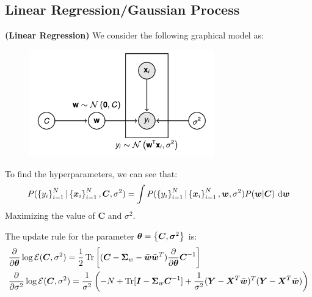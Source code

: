 \subsection{Linear Regression/Gaussian Process}

\begin{definition}{\textbf{(Linear Regression)}}
    We consider the following graphical model as:
    \begin{figure}[H]
        \centering
        \includegraphics[width=8cm]{img/img11.png}
    \end{figure}  
    To find the hyperparameters, we can see that:
    \begin{equation*}
        P(\left\{ y_i \right\}^N_{i=1} | \left\{ \boldsymbol x_i \right\}^N_{i=1}, \boldsymbol C, \sigma^2) = \int P(\left\{ y_i \right\}^N_{i=1} | \left\{ \boldsymbol x_i \right\}^N_{i=1}, \boldsymbol w, \sigma^2)P(\boldsymbol w | \boldsymbol C)\ \mathrm{d} \boldsymbol w
    \end{equation*}
    Maximizing the value of $\boldsymbol C$ and $\sigma^2$.
\end{definition}

\begin{proposition}
    The update rule for the parameter $\boldsymbol \theta = \left\{ \boldsymbol C, \boldsymbol \sigma^2 \right\}$ is:
    \begin{equation*}
    \begin{aligned}
        &\frac{\partial}{\partial \boldsymbol \theta} \log \mathcal{E}(\boldsymbol C, \sigma^2) = \frac{1}{2}\operatorname{Tr}\left[ (\boldsymbol C - \boldsymbol \Sigma_w - \bar{\boldsymbol w}\bar{\boldsymbol w}^T)\frac{\partial}{\partial \boldsymbol \theta} \boldsymbol C^{-1} \right] \\
        &\frac{\partial}{\partial \sigma^2}\log\mathcal{E}(\boldsymbol C,\sigma^2) = \frac{1}{\sigma^2}\left( -N + \operatorname{Tr}[\boldsymbol I - \boldsymbol \Sigma_w\boldsymbol C^{-1}] + \frac{1}{\sigma^2}(\boldsymbol Y - \boldsymbol X^T\bar{\boldsymbol w})^T(\boldsymbol Y - \boldsymbol X^T\bar{\boldsymbol w}) \right)
    \end{aligned}
    \end{equation*}
\end{proposition}

